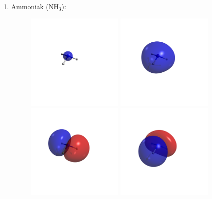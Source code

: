 \begin{enumerate}
\newpage
\item Ammoniak (NH$_3$):
\begin{figure}[H]
\centering
\includegraphics[trim=700 1200 1200 700, clip, width=0.45\textwidth]{res/NH3/nh3_w0.png}
\includegraphics[trim=700 1200 1200 700, clip, width=0.45\textwidth]{res/NH3/nh3_w1.png}\\
\includegraphics[trim=700 1200 1200 700, clip, width=0.45\textwidth]{res/NH3/nh3_w2.png}
\includegraphics[trim=700 1200 1200 700, clip, width=0.45\textwidth]{res/NH3/nh3_w3.png}\\

\end{figure}
\end{enumerate}
